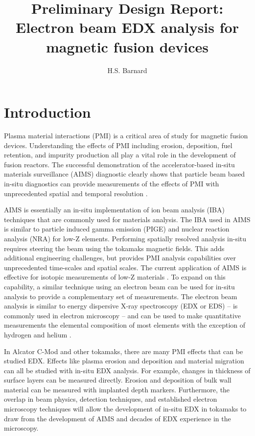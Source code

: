 \documentclass[12pt,letterpaper,final]{article}
\author{H.S. Barnard}
\title{Preliminary Design Report: Electron beam EDX analysis for magnetic fusion devices}
\begin{document}
\maketitle
%

\section{Introduction}

Plasma material interactions (PMI) is a critical area of study for magnetic fusion devices.  Understanding the effects of PMI including erosion, deposition, fuel retention, and impurity production all play a vital role in the development of fusion reactors. The successful demonstration of the accelerator-based in-situ materials surveillance (AIMS) diagnostic clearly shows that particle beam based in-situ diagnostics can provide measurements of the effects of PMI with unprecedented spatial and temporal resolution \cite{barnard2014thesis,hartwig2013thesis,hartwig2013situ}.

AIMS is essentially an in-situ implementation of ion beam analysis (IBA) techniques that are commonly used for materials analysis. The IBA used in AIMS is similar to particle induced gamma emission (PIGE) and nuclear reaction analysis (NRA) for low-Z elements. Performing spatially resolved analysis in-situ requires steering the beam using the tokamaks magnetic fields.  This adds additional engineering challenges, but provides PMI analysis capabilities over unprecedented time-scales and spatial scales. The current application of AIMS is effective for isotopic measurements of low-Z materials \cite{hartwig2014fuel,barnard2015boron}. To expand on this capability, a similar technique using an electron beam can be used for in-situ analysis to provide a complementary set of measurements. The electron beam analysis is similar to energy dispersive X-ray spectroscopy (EDX or EDS) -- is commonly used in electron microscopy -- and can be used to make quantitative measurements the elemental composition of most elements with the exception of hydrogen and helium \cite{goldstein1997scanning}. 

In Alcator C-Mod and other tokamaks, there are many PMI effects that can be studied EDX. Effects like plasma erosion and deposition and material migration can all be studied with in-situ EDX analysis. For example, changes in thickness of surface layers can be measured directly. Erosion and deposition of bulk wall material can be measured with implanted depth markers. Furthermore, the overlap in beam physics, detection techniques, and established electron microscopy techniques will allow the development of in-situ EDX in tokamaks to draw from the development of AIMS and decades of EDX experience in the microscopy.
\end{document}
